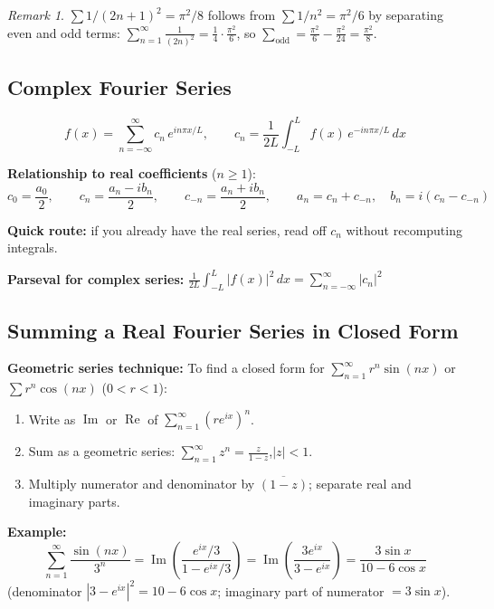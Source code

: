 \documentclass[12pt, a4paper]{article}
\theoremstyle{definition}
\theoremstyle{remark}
\newtheorem*{remark}{Remark}
\begin{document}
\begin{remark}
$\sum 1/(2n+1)^2 = \pi^2/8$ follows from $\sum 1/n^2 = \pi^2/6$ by separating even and odd terms:
$\sum_{n=1}^\infty \frac{1}{(2n)^2} = \frac{1}{4}\cdot\frac{\pi^2}{6}$, so
$\sum_{\text{odd}} = \frac{\pi^2}{6} - \frac{\pi^2}{24} = \frac{\pi^2}{8}$.
\end{remark}

\subsection{Complex Fourier Series}

\[
  f(x) = \sum_{n=-\infty}^\infty c_n\, e^{in\pi x/L},
  \qquad
  c_n = \frac{1}{2L}\int_{-L}^{L} f(x)\,e^{-in\pi x/L}\,dx
\]

\textbf{Relationship to real coefficients} ($n \ge 1$):
\[
  c_0 = \frac{a_0}{2},
  \qquad
  c_n = \frac{a_n - ib_n}{2},
  \qquad
  c_{-n} = \frac{a_n + ib_n}{2},
  \qquad
  a_n = c_n + c_{-n}, \quad b_n = i(c_n - c_{-n})
\]

\textbf{Quick route:} if you already have the real series, read off $c_n$ without recomputing integrals.

\textbf{Parseval for complex series:}
$\displaystyle\frac{1}{2L}\int_{-L}^L |f(x)|^2\,dx = \sum_{n=-\infty}^\infty |c_n|^2$

\subsection{Summing a Real Fourier Series in Closed Form}

\textbf{Geometric series technique:}
To find a closed form for $\displaystyle\sum_{n=1}^\infty r^n\sin(nx)$ or $\sum r^n\cos(nx)$ ($0<r<1$):
\begin{enumerate}
  \item Write as $\operatorname{Im}$ or $\operatorname{Re}$ of $\displaystyle\sum_{n=1}^\infty (re^{ix})^n$.
  \item Sum as a geometric series: $\displaystyle\sum_{n=1}^\infty z^n = \frac{z}{1-z}$,\quad $|z|<1$.
  \item Multiply numerator and denominator by $\overline{(1-z)}$; separate real and imaginary parts.
\end{enumerate}

\textbf{Example:}
\[
  \sum_{n=1}^\infty \frac{\sin(nx)}{3^n}
  = \operatorname{Im}\!\left(\frac{e^{ix}/3}{1-e^{ix}/3}\right)
  = \operatorname{Im}\!\left(\frac{3e^{ix}}{3-e^{ix}}\right)
  = \frac{3\sin x}{10-6\cos x}
\]
(denominator $|3-e^{ix}|^2 = 10-6\cos x$; imaginary part of numerator $= 3\sin x$).
\end{document}
